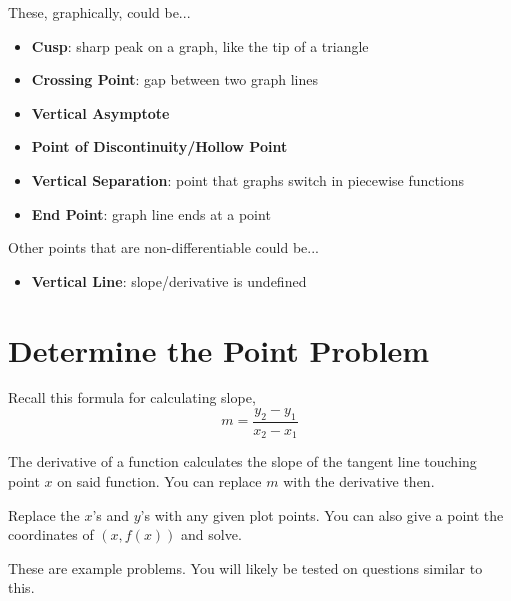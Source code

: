 \documentclass[a4paper,12pt]{article}
\begin{document}
These, graphically, could be...
\begin{itemize}
    \item{\textbf{Cusp}: sharp peak on a graph, like the tip of a triangle}
    \item{\textbf{Crossing Point}: gap between two graph lines}
    \item{\textbf{Vertical Asymptote}}
    \item{\textbf{Point of Discontinuity/Hollow Point}}
    \item{\textbf{Vertical Separation}: point that graphs switch in piecewise functions}
    \item{\textbf{End Point}: graph line ends at a point}
\end{itemize}

Other points that are non-differentiable could be...
\begin{itemize}
    \item{\textbf{Vertical Line}: slope/derivative is undefined}
\end{itemize}

\pagebreak

\section{Determine the Point Problem}
Recall this formula for calculating slope,
$$m = \frac{y_2 - y_1}{x_2 - x_1}$$

The derivative of a function calculates the slope of the tangent line touching point $x$ on said function. You can replace $m$ with the derivative then.

Replace the $x$'s and $y$'s with any given plot points. You can also give a point the coordinates of $(x, f(x))$ and solve.

These are example problems. You will likely be tested on questions similar to this.
\end{document}
